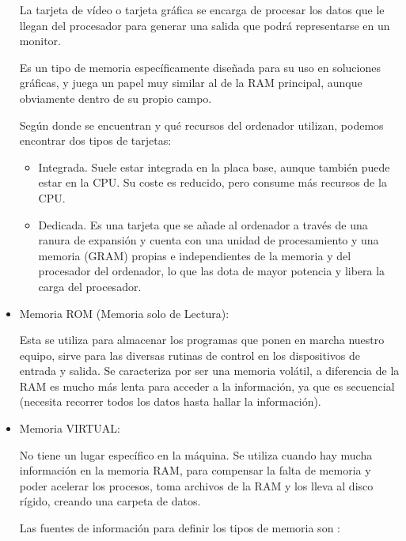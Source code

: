 \documentclass[12pt,oneside]{book}
\begin{document}
\begin{itemize}
        La tarjeta de vídeo o tarjeta gráfica se encarga de procesar los datos que le llegan del procesador para generar una salida que podrá representarse en un monitor.
        
        Es un tipo de memoria específicamente diseñada para su uso en soluciones gráficas, y juega un papel muy similar al de la RAM principal, aunque obviamente dentro de su propio campo.
        
        Según donde se encuentran y qué recursos del ordenador utilizan, podemos encontrar dos tipos de tarjetas:
        
         \begin{itemize}
            \item Integrada. Suele estar integrada en la placa base, aunque también puede estar en la CPU. Su coste es reducido, pero consume más recursos de la CPU.
        
            \item Dedicada. Es una tarjeta que se añade al ordenador a través de una ranura de expansión y cuenta con una unidad de procesamiento y una memoria (GRAM) propias e independientes de la memoria y del procesador del ordenador, lo que las dota de mayor potencia y libera la carga del procesador.

        
        \end{itemize} 
  
        \item { Memoria ROM (Memoria solo de Lectura)}:
        
        Esta se utiliza para almacenar los programas que ponen en marcha nuestro equipo, sirve para las diversas rutinas de control en los dispositivos de entrada y salida. 
        Se caracteriza por ser una memoria volátil, a diferencia de la RAM es mucho más lenta para acceder a la información, ya que es secuencial (necesita recorrer todos los datos hasta hallar la información).
        
         \item { Memoria VIRTUAL}:
         
         No tiene un lugar específico en la máquina. 
        Se utiliza  cuando hay mucha información en la memoria RAM, para compensar la falta de memoria y poder acelerar los procesos, toma archivos de la RAM y los lleva al disco rígido, creando una carpeta de datos.

Las fuentes de información para definir los tipos de memoria son :
 \cite{tipos}
 \cite{memoria}
 \cite{RAM}
 \cite{tarjeta-grafica}
 \cite{memoria-computadora}


\end{itemize}
\end{document}
